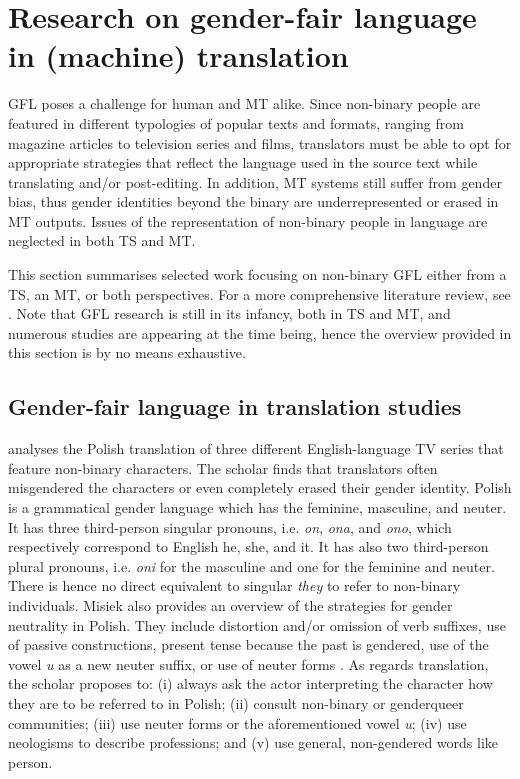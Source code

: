 \section{Research on gender-fair language in (machine) translation} \label{relatedwork}
GFL poses a challenge for human and MT alike. Since non-binary people are featured in different typologies of popular texts and formats, ranging from magazine articles to television series and films, translators must be able to opt for appropriate strategies that reflect the language used in the source text \citep{misiek2020misgendered} while translating and/or post-editing. In addition, MT systems still suffer from gender bias, thus gender identities beyond the binary are underrepresented or erased in MT outputs. Issues of the representation of non-binary people in language are neglected in both TS and MT. 

This section summarises selected work focusing on non-binary GFL either from a TS, an MT, or both perspectives. For a more comprehensive literature review, see \textcite{nettt2022}. Note that GFL research is still in its infancy, both in TS and MT, and numerous studies are appearing at the time being, hence the overview provided in this section is by no means exhaustive. 

\subsection{Gender-fair language in translation studies} \label{sec:genderfairtranslation}

\textcite{misiek2020misgendered} analyses the Polish translation of three different English-language TV series that feature non-binary characters. 
The scholar finds that translators often misgendered the characters or even completely erased their gender identity. Polish is a grammatical gender language which has the feminine, masculine, and neuter. It has three third-person singular pronouns, i.e. \textit{on}, \textit{ona}, and \textit{ono}, which respectively correspond to English he, she, and it. It has also two third-person plural pronouns, i.e. \textit{oni} for the masculine and one for the feminine and neuter. There is hence no direct equivalent to singular \textit{they} to refer to non-binary individuals. Misiek also provides an overview of the strategies for gender neutrality in Polish. They include distortion and/or omission of verb suffixes, use of passive constructions, present tense because the past is gendered, use of the vowel \textit{u} as a new neuter suffix, or use of neuter forms \citep[167]{misiek2020misgendered}. As regards translation, the scholar proposes to: (i) always ask the actor interpreting the character how they are to be referred to in Polish; (ii) consult non-binary or genderqueer communities; (iii) use neuter forms or the aforementioned vowel \textit{u}; (iv) use neologisms to describe professions; and (v) use general, non-gendered words like person.


